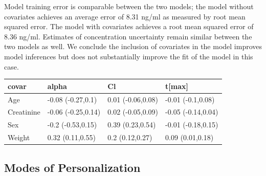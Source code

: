 Model training error is comparable between the two models; the model without covariates achieves an average error of 8.31 ng/ml as measured by root mean squared error.  The model with covariates achieves a root mean squared error of 8.36  ng/ml.  Estimates of concentration uncertainty remain similar between the two models as well.  We conclude the inclusion of covariates in the model improves model inferences but does not substantially improve the fit of the model in this case.

\begin{tabular}{l|l|l|l}
\hline
covar & alpha & Cl & t[max]\\
\hline
Age & -0.08 (-0.27,0.1) & 0.01 (-0.06,0.08) & -0.01 (-0.1,0.08)\\
\hline
Creatinine & -0.06 (-0.25,0.14) & 0.02 (-0.05,0.09) & -0.05 (-0.14,0.04)\\
\hline
Sex & -0.2 (-0.53,0.15) & 0.39 (0.23,0.54) & -0.01 (-0.18,0.15)\\
\hline
Weight & 0.32 (0.11,0.55) & 0.2 (0.12,0.27) & 0.09 (0.01,0.18)\\
\hline

\end{tabular}



\subsection{Modes of Personalization}



